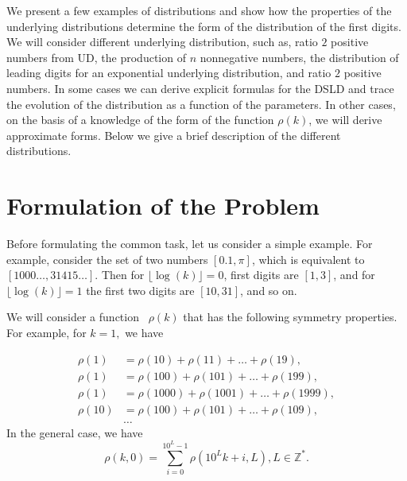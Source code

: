 \documentclass[titlepage,fleqn]{article}%
\providecommand{\U}[1]{\protect\rule{.1in}{.1in}}
\begin{document}
We present a few examples of distributions and show how the properties of the
underlying distributions determine the form of the distribution of the first
digits. We will consider different underlying distribution, such as, ratio $2$
positive numbers from UD, the production of $n$ nonnegative numbers, the
distribution of leading digits for an exponential underlying distribution, and
ratio $2$ positive numbers. In some cases we can derive explicit formulas for
the DSLD and trace the evolution of the distribution as a function of the
parameters. In other cases, on the basis of a knowledge of the form of the
function $\rho(k)$, we will derive approximate forms. Below we give a brief
description of the different distributions.

\section{Formulation of the Problem}%

\label{FormulationOf prob}%


Before formulating the common task, let us consider a simple example. For
example, consider the set of two numbers $[0.1,\pi]$, which is equivalent to
$[1000\ldots,31415\ldots]$. Then for $\lfloor\log(k)\rfloor=0$, first digits
are $[1,3]$, and for $\lfloor\log(k)\rfloor=1$ the first two digits are
$[10,31]$, and so on.

We will consider a function \ $\rho(k)$ that has the following symmetry
properties. For example, for $k=1,$ we have%

\begin{align}
\rho(1)  &  =\rho(10)+\rho(11)+\ldots+\rho(19),\label{Cond1}\\
\rho(1)  &  =\rho(100)+\rho(101)+\ldots+\rho(199),\nonumber\\
\rho(1)  &  =\rho(1000)+\rho(1001)+\ldots+\rho(1999),\nonumber\\
\rho(10)  &  =\rho(100)+\rho(101)+\ldots+\rho(109),\nonumber\\
&  \ldots\nonumber
\end{align}
In the general case, we have%
\begin{equation}
\rho(k,0)=%
{\displaystyle\sum\limits_{i=0}^{10^{L}-1}}
\rho(10^{L}k+i,L),L\in%
\mathbb{Z}
^{\ast}. \label{MainEq_1}%
\end{equation}
%
\end{document}
